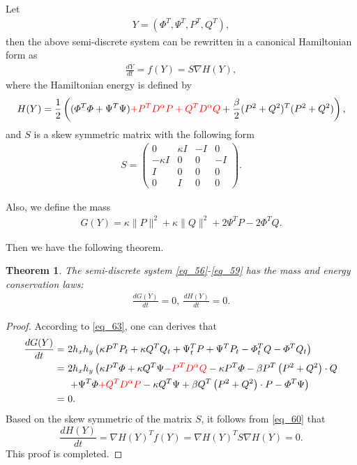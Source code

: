 \documentclass[preprint,compress,3p,10pt,fleqn]{elsarticle}
\numberwithin{equation}{section}
\newtheorem{theorem}{Theorem}[section]
\begin{document}
Let
\begin{align}\label{eq_60a}
Y=\left(\varPhi^{T}, \Psi^{T}, P^{T}, Q^{T}\right),
\end{align}
then the above semi-discrete system can be rewritten in a canonical Hamiltonian form as
\begin{align}\label{eq_60}
\frac{d Y}{d t}=f(Y)=S \nabla H(Y),
\end{align}
where the Hamiltonian energy is defined by
\begin{align}\label{eq_61}
	H(Y)=\frac{1}{2}\left((\varPhi^{T}\varPhi+\Psi^{T}\Psi)\textcolor[rgb]{1.00,0.00,0.00}{+P^{T} D^{\alpha} P+Q^{T} D^{\alpha} Q}+\frac{\beta}{2}(P^2+Q^2)^{T}(P^2+Q^2)\right),
\end{align}
and $S$ is a skew symmetric matrix with the following form
\begin{align}\label{eq_62}
S=\left(\begin{array}{cccc}
0 & \kappa I & -I & 0 \\
-\kappa I & 0 & 0 & -I \\
I & 0 & 0 & 0 \\
0 & I & 0 & 0
\end{array}\right).
\end{align}

Also, we define the mass
\begin{align}\label{eq_63}
G(Y)=\kappa\|P\|^{2}+\kappa\|Q\|^{2} +2\Psi^{T}P-2\varPhi^{T}Q.
\end{align}

Then we have the following theorem.
\begin{theorem}	\label{thm3}
	The semi-discrete system \eqref{eq_56}-\eqref{eq_59} has the mass and energy conservation laws:
\begin{align}
\frac{d G(Y)}{d t}=0,~\frac{d H(Y)}{d t}=0.
\end{align}
\end{theorem}

\begin{proof}
According to \eqref{eq_63}, one can derives that
\begin{align}\label{eq_64}
\frac{d G(Y)}{d t}=&~2 h_{x} h_{y}\left(\kappa P^{T}P_t+\kappa Q^{T}Q_t+\Psi^{T}_t P+\Psi^{T}P_{t}-\varPhi^{T}_t Q-\varPhi^{T}Q_{t}\right)\nonumber\\
=&~2 h_{x} h_{y}\left(\kappa P^{T}\varPhi+\kappa Q^{T}\Psi \textcolor[rgb]{1.00,0.00,0.00}{- P^{T}D^{\alpha}Q}-\kappa P^{T}\varPhi-\beta P^{T}\left( P^{2}+Q^{2}\right)\cdot Q\right.\nonumber\\
&~\left.+\Psi^{T}\varPhi\textcolor[rgb]{1.00,0.00,0.00}{+Q^{T}D^{\alpha}P}-\kappa Q^{T}\Psi+\beta Q^{T}\left( P^{2}+Q^{2}\right)\cdot P-\varPhi^{T}\Psi\right)\nonumber\\
=&~0.
\end{align}
Based on the skew symmetric of the matrix $S$, it follows from \eqref{eq_60} that
\begin{equation}\label{eq_65}
\frac{d H(Y)}{d t}=\nabla H(Y)^{T} f(Y)=\nabla H(Y)^{T} S \nabla H(Y)=0 .
\end{equation}
This proof is completed.
\end{proof}
\end{document}
